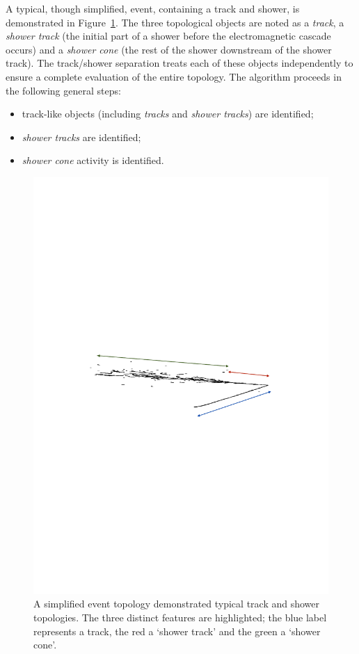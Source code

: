 A typical, though simplified, event, containing a track and shower, is demonstrated in Figure~\ref{fig:TrackShowerTopology}.  The three topological objects are noted as a \textit{track}, a \textit{shower track} (the initial part of a shower before the electromagnetic cascade occurs) and a \textit{shower cone} (the rest of the shower downstream of the shower track).  The track/shower separation treats each of these objects independently to ensure a complete evaluation of the entire topology.  The algorithm proceeds in the following general steps:
\begin{itemize}
  \item track-like objects (including \textit{tracks} and \textit{shower tracks}) are identified;
  \item \textit{shower tracks} are identified;
  \item \textit{shower cone} activity is identified.
\end{itemize}

\begin{figure}
  \centering
  \includegraphics[width=12cm]{TrackShowerExampleEVDAnnotated.pdf}
  \caption[A simplified event topology demonstrated typical track and shower topologies.]{A simplified event topology demonstrated typical track and shower topologies.  The three distinct features are highlighted; the blue label represents a track, the red a `shower track' and the green a `shower cone'.}
  \label{fig:TrackShowerTopology}
\end{figure}

